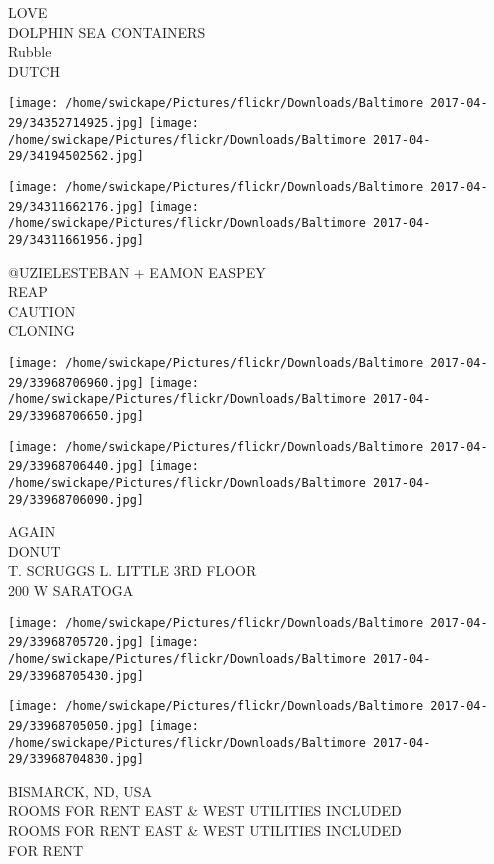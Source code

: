 \documentclass[10pt,letterpaper]{article}
\begin{document}
LOVE\\
DOLPHIN SEA CONTAINERS\\
Rubble\\
DUTCH\\
\pagebreak

\texttt{[image: /home/swickape/Pictures/flickr/Downloads/Baltimore 2017-04-29/34352714925.jpg]}
\texttt{[image: /home/swickape/Pictures/flickr/Downloads/Baltimore 2017-04-29/34194502562.jpg]}

\texttt{[image: /home/swickape/Pictures/flickr/Downloads/Baltimore 2017-04-29/34311662176.jpg]}
\texttt{[image: /home/swickape/Pictures/flickr/Downloads/Baltimore 2017-04-29/34311661956.jpg]}

@UZIELESTEBAN + EAMON EASPEY\\
REAP\\
CAUTION\\
CLONING\\
\pagebreak

\texttt{[image: /home/swickape/Pictures/flickr/Downloads/Baltimore 2017-04-29/33968706960.jpg]}
\texttt{[image: /home/swickape/Pictures/flickr/Downloads/Baltimore 2017-04-29/33968706650.jpg]}

\texttt{[image: /home/swickape/Pictures/flickr/Downloads/Baltimore 2017-04-29/33968706440.jpg]}
\texttt{[image: /home/swickape/Pictures/flickr/Downloads/Baltimore 2017-04-29/33968706090.jpg]}

AGAIN\\
DONUT\\
T. SCRUGGS L. LITTLE 3RD FLOOR\\
200 W SARATOGA\\
\pagebreak

\texttt{[image: /home/swickape/Pictures/flickr/Downloads/Baltimore 2017-04-29/33968705720.jpg]}
\texttt{[image: /home/swickape/Pictures/flickr/Downloads/Baltimore 2017-04-29/33968705430.jpg]}

\texttt{[image: /home/swickape/Pictures/flickr/Downloads/Baltimore 2017-04-29/33968705050.jpg]}
\texttt{[image: /home/swickape/Pictures/flickr/Downloads/Baltimore 2017-04-29/33968704830.jpg]}

BISMARCK, ND, USA\\
ROOMS FOR RENT EAST \& WEST UTILITIES INCLUDED\\
ROOMS FOR RENT EAST \& WEST UTILITIES INCLUDED\\
FOR RENT\\
\pagebreak
\end{document}
